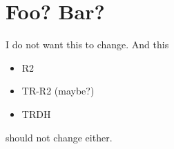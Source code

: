 \section{Foo? Bar?}

I do not want this to change.
And this
\begin{itemize}
  \item R2
  \item TR-R2 (maybe?)
  \item TRDH
\end{itemize}
should not change either.
